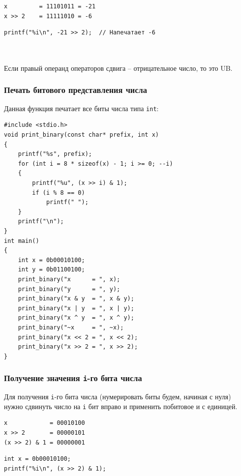 \documentclass[10pt]{article}
\begin{document}
\begin{minipage}{0.35\textwidth}
\begin{verbatim}
x         = 11101011 = -21
x >> 2    = 11111010 = -6
\end{verbatim}
\end{minipage}
\hfill
\begin{minipage}{0.55\textwidth}
\begin{lstlisting}
printf("%i\n", -21 >> 2);  // Напечатает -6
\end{lstlisting}
\end{minipage}
\quad\\
\quad\\
Если правый операнд операторов сдвига -- отрицательное число, то это UB.

\subsubsection*{Печать битового представления числа}
Данная функция печатает все биты числа типа \texttt{int}:
\begin{lstlisting}
#include <stdio.h>
void print_binary(const char* prefix, int x)
{
    printf("%s", prefix);
    for (int i = 8 * sizeof(x) - 1; i >= 0; --i)
    {
        printf("%u", (x >> i) & 1);
        if (i % 8 == 0)
            printf(" ");
    }
    printf("\n");
}
int main() 
{
    int x = 0b00010100;
    int y = 0b01100100;
    print_binary("x      = ", x);
    print_binary("y      = ", y);
    print_binary("x & y  = ", x & y);
    print_binary("x | y  = ", x | y);
    print_binary("x ^ y  = ", x ^ y);
    print_binary("~x     = ", ~x);
    print_binary("x << 2 = ", x << 2);
    print_binary("x >> 2 = ", x >> 2);
}
\end{lstlisting}

\subsubsection*{Получение значения \texttt{i}-го бита числа}
Для получения \texttt{i}-го бита числа (нумерировать биты будем, начиная с нуля) нужно сдвинуть число на \texttt{i} бит вправо и применить побитовое и с единицей.

\begin{minipage}{0.35\textwidth}
\begin{lstlisting}
x            = 00010100
x >> 2       = 00000101
(x >> 2) & 1 = 00000001
\end{lstlisting}
\end{minipage}
\hfill
\begin{minipage}{0.55\textwidth}
\begin{lstlisting}
int x = 0b00010100;
printf("%i\n", (x >> 2) & 1);
\end{lstlisting}
\end{minipage}
\end{document}
